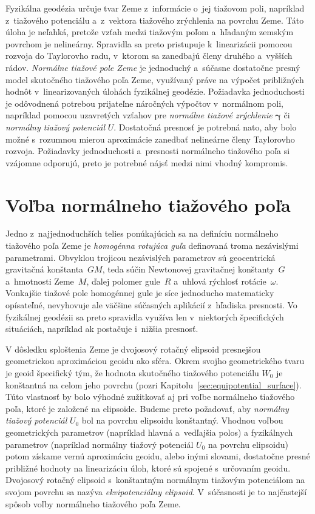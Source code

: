 \documentclass[a4paper, 12pt]{book}
\begin{document}
Fyzikálna geodézia určuje tvar Zeme z~informácie o~jej tiažovom poli, napríklad 
z~tiažového potenciálu a~z~vektora tiažového zrýchlenia na povrchu Zeme.  Táto 
úloha je neľahká, pretože vzťah medzi tiažovým poľom a~hľadaným zemským 
povrchom je nelineárny.  Spravidla sa preto pristupuje k~linearizácii pomocou 
rozvoja do Taylorovho radu, v~ktorom sa zanedbajú členy druhého a~vyšších 
rádov.  \emph{Normálne tiažové pole Zeme} je jednoduchý a~súčasne dostatočne 
presný model skutočného tiažového poľa Zeme, využívaný práve na výpočet 
približných hodnôt v~linearizovaných úlohách fyzikálnej geodézie.  Požiadavka 
jednoduchosti je odôvodnená potrebou prijateľne náročných výpočtov v~normálnom 
poli, napríklad pomocou uzavretých vzťahov pre \emph{normálne tiažové 
zrýchlenie} $\boldsymbol{\gamma}$ či \emph{normálny tiažový potenciál} $U$.  
Dostatočná presnosť je potrebná nato, aby bolo možné s~rozumnou mierou 
aproximácie zanedbať nelineárne členy Taylorovho rozvoja.  Požiadavky 
jednoduchosti a~presnosti normálneho tiažového poľa si vzájomne odporujú, preto 
je potrebné nájsť medzi nimi vhodný kompromis.

\section{Voľba normálneho tiažového poľa}
\label{sec:choice_of_normal_gravity_field}

Jedno z~najjednoduchších telies ponúkajúcich sa na definíciu normálneho 
tiažového poľa Zeme je \emph{homogénna rotujúca guľa} definovaná troma 
nezávislými parametrami.  Obvyklou trojicou nezávislých parametrov sú 
geocentrická gravitačná konštanta~$GM$, teda súčin Newtonovej gravitačnej 
konštanty~$G$ a~hmotnosti Zeme~$M$, ďalej polomer gule~$R$ a~uhlová rýchlosť 
rotácie~$\omega$.  Vonkajšie tiažové pole homogénnej gule je síce jednoducho 
matematicky opísateľné, nevyhovuje ale väčšine súčasných aplikácií z~hľadiska 
presnosti.  Vo fyzikálnej geodézii sa preto spravidla využíva len v~niektorých 
špecifických situáciách, napríklad ak postačuje i~nižšia presnosť.

V dôsledku sploštenia Zeme je dvojosový rotačný elipsoid presnejšou 
geometrickou aproximáciou geoidu ako sféra.  Okrem svojho geometrického tvaru 
je geoid špecifický tým, že hodnota skutočného tiažového potenciálu $W_0$ je 
konštantná na celom jeho povrchu (pozri 
Kapitolu~\ref{sec:equipotential_surface}).  Túto vlastnosť by bolo výhodné 
zužitkovať aj pri voľbe normálneho tiažového poľa, ktoré je založené na 
elipsoide.  Budeme preto požadovať, aby \emph{normálny tiažový potenciál} $U_0$ 
bol na povrchu elipsoidu konštantný.  Vhodnou voľbou geometrických parametrov 
(napríklad hlavná a~vedľajšia polos) a fyzikálnych parametrov (napríklad 
normálny tiažový potenciál $U_0$ na povrchu elipsoidu) potom získame vernú 
aproximáciu geoidu, alebo inými slovami, dostatočne presné približné hodnoty na 
linearizáciu úloh, ktoré sú spojené s~určovaním geoidu.  Dvojosový rotačný 
elipsoid s~konštantným normálnym tiažovým potenciálom na svojom povrchu sa 
nazýva \emph{ekvipotenciálny elipsoid}.  V~súčasnosti je to najčastejší spôsob 
voľby normálneho tiažového poľa Zeme.
\end{document}
